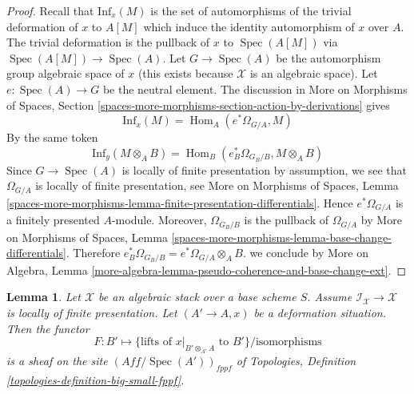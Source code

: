 \documentclass{stacks-project}
\theoremstyle{plain}
\newtheorem{lemma}[subsection]{Lemma}
\theoremstyle{definition}
\theoremstyle{remark}
\numberwithin{equation}{subsection}
\def\Spec{\mathop{\mathrm{Spec}}}
\def\Hom{\mathop{\mathrm{Hom}}\nolimits}
\begin{document}
\begin{proof}
Recall that $\text{Inf}_x(M)$ is the set of automorphisms of the
trivial deformation of $x$ to $A[M]$ which induce the identity
automorphism of $x$ over $A$. The trivial deformation is
the pullback of $x$ to $\Spec(A[M])$ via $\Spec(A[M]) \to \Spec(A)$.
Let $G \to \Spec(A)$ be the automorphism group algebraic space of $x$
(this exists because $\mathcal{X}$ is an algebraic space).
Let $e : \Spec(A) \to G$ be the neutral element.
The discussion in More on Morphisms of Spaces, Section
\ref{spaces-more-morphisms-section-action-by-derivations}
gives
$$
\text{Inf}_x(M) = \Hom_A(e^*\Omega_{G/A}, M)
$$
By the same token
$$
\text{Inf}_y(M \otimes_A B) = \Hom_B(e_B^*\Omega_{G_B/B}, M \otimes_A B)
$$
Since $G \to \Spec(A)$ is locally of finite presentation by
assumption, we see that $\Omega_{G/A}$ is locally of finite
presentation, see
More on Morphisms of Spaces, Lemma
\ref{spaces-more-morphisms-lemma-finite-presentation-differentials}.
Hence $e^*\Omega_{G/A}$ is a finitely presented $A$-module.
Moreover, $\Omega_{G_B/B}$ is the pullback of $\Omega_{G/A}$ by
More on Morphisms of Spaces, Lemma
\ref{spaces-more-morphisms-lemma-base-change-differentials}.
Therefore $e_B^*\Omega_{G_B/B} = e^*\Omega_{G/A} \otimes_A B$.
we conclude by More on Algebra, Lemma
\ref{more-algebra-lemma-pseudo-coherence-and-base-change-ext}.
\end{proof}

\begin{lemma}
\label{lemma-sheaf-of-infinitesimal-lifts}
Let $\mathcal{X}$ be an algebraic stack over a base scheme $S$.
Assume $\mathcal{I}_\mathcal{X} \to \mathcal{X}$ is locally
of finite presentation. Let $(A' \to A, x)$ be a deformation situation.
Then the functor
$$
F : B' \longmapsto
\{\text{lifts of }x|_{B' \otimes_{A'} A}\text{ to } B'\}/\text{isomorphisms}
$$
is a sheaf on the site $(\textit{Aff}/\Spec(A'))_{fppf}$ of
Topologies, Definition \ref{topologies-definition-big-small-fppf}.
\end{lemma}
\end{document}
